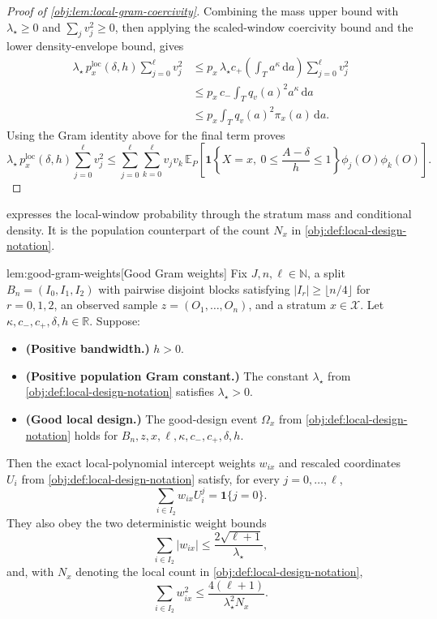 \documentclass[11pt]{article}
\begin{document}
\begin{proof}[Proof of \cref{obj:lem:local-gram-coercivity}]
Combining the mass upper bound with \(\lambda_\star\ge0\) and \(\sum_j v_j^2\ge0\), then applying the scaled-window coercivity bound and the lower density-envelope bound, gives
\[
\begin{aligned}
\lambda_\star\,p_x^{\mathrm{loc}}(\delta,h)\sum_{j=0}^{\ell}v_j^2
&\le
p_x\,\lambda_\star c_+\!\left(\int_T a^\kappa\,\mathrm da\right)
\sum_{j=0}^{\ell}v_j^2 \\
&\le
p_x\,c_-\int_T q_v(a)^2a^\kappa\,\mathrm da \\
&\le
p_x\int_T q_v(a)^2\pi_x(a)\,\mathrm da .
\end{aligned}
\]
Using the Gram identity above for the final term proves
\[
\lambda_\star\,p_x^{\mathrm{loc}}(\delta,h)\sum_{j=0}^{\ell}v_j^2
\le
\sum_{j=0}^{\ell}\sum_{k=0}^{\ell}
v_jv_k\,
\mathbb E_P\!\left[
\mathbf 1\!\left\{X=x,\ 0\le \frac{A-\delta}{h}\le 1\right\}
\phi_j(O)\phi_k(O)\right].
\]
\end{proof}

 expresses the local-window probability through the stratum mass and conditional density. It is the population counterpart of the count \(N_x\) in \cref{obj:def:local-design-notation}.

\begin{lemmav}{lem:good-gram-weights}[Good Gram weights]
Fix \(J,n,\ell\in\mathbb N\), a split \(B_n=(I_0,I_1,I_2)\) with pairwise disjoint blocks satisfying \(|I_r|\ge \lfloor n/4\rfloor\) for \(r=0,1,2\), an observed sample \(z=(O_1,\ldots,O_n)\), and a stratum \(x\in\mathcal X\).  Let \(\kappa,c_-,c_+,\delta,h\in\mathbb R\).  Suppose:
\begin{itemize}
\item \textbf{(Positive bandwidth.)} \(h>0\).
\item \textbf{(Positive population Gram constant.)} The constant \(\lambda_\star\) from \cref{obj:def:local-design-notation} satisfies \(\lambda_\star>0\).
\item \textbf{(Good local design.)} The good-design event \(\Omega_x\) from \cref{obj:def:local-design-notation} holds for \(B_n,z,x,\ell,\kappa,c_-,c_+,\delta,h\).
\end{itemize}
Then the exact local-polynomial intercept weights \(w_{ix}\) and rescaled coordinates \(U_i\) from \cref{obj:def:local-design-notation} satisfy, for every \(j=0,\ldots,\ell\),
\[
\sum_{i\in I_2} w_{ix} U_i^j=\mathbf 1\{j=0\}.
\]
They also obey the two deterministic weight bounds
\[
\sum_{i\in I_2}|w_{ix}|
\le
\frac{2\sqrt{\ell+1}}{\lambda_\star},
\]
and, with \(N_x\) denoting the local count in \cref{obj:def:local-design-notation},
\[
\sum_{i\in I_2}w_{ix}^2
\le
\frac{4(\ell+1)}{\lambda_\star^2 N_x}.
\]
\end{lemmav}
\end{document}
